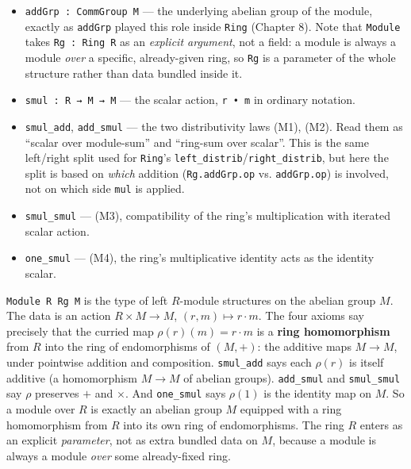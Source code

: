 \begin{itemize}
\tightlist
\item
  \texttt{addGrp : CommGroup M} --- the underlying abelian group of the module, exactly as \texttt{addGrp} played this role inside \texttt{Ring} (Chapter 8). Note that \texttt{Module} takes \texttt{Rg : Ring R} as an \emph{explicit argument}, not a field: a module is always a module \emph{over} a specific, already-given ring, so \texttt{Rg} is a parameter of the whole structure rather than data bundled inside it.
\item
  \texttt{smul : R → M → M} --- the scalar action, \texttt{r • m} in ordinary notation.
\item
  \texttt{smul\_\allowbreak{}add}, \texttt{add\_\allowbreak{}smul} --- the two distributivity laws (M1), (M2). Read them as ``scalar over module-sum'' and ``ring-sum over scalar''. This is the same left/right split used for \texttt{Ring}'s \texttt{left\_\allowbreak{}distrib}/\texttt{right\_\allowbreak{}distrib}, but here the split is based on \emph{which} addition (\texttt{Rg.addGrp.op} vs. \texttt{addGrp.op}) is involved, not on which side \texttt{mul} is applied.
\item
  \texttt{smul\_\allowbreak{}smul} --- (M3), compatibility of the ring's multiplication with iterated scalar action.
\item
  \texttt{one\_\allowbreak{}smul} --- (M4), the ring's multiplicative identity acts as the identity scalar.
\end{itemize}

\begin{mathreading}

\texttt{Module R Rg M} is the type of left \(R\)-module structures on the abelian group \(M\). The data is an action \(R \times M \to
M\), \((r,m)\mapsto r\cdot m\). The four axioms say precisely that the curried map \(\rho(r)(m) = r\cdot m\) is a \textbf{ring homomorphism} from \(R\) into the ring of endomorphisms of \((M,+)\): the additive maps \(M \to M\), under pointwise addition and composition. \texttt{smul\_\allowbreak{}add} says each \(\rho(r)\) is itself additive (a homomorphism \(M \to M\) of abelian groups). \texttt{add\_\allowbreak{}smul} and \texttt{smul\_\allowbreak{}smul} say \(\rho\) preserves \(+\) and \(\times\). And \texttt{one\_\allowbreak{}smul} says \(\rho(1)\) is the identity map on \(M\). So a module over \(R\) is exactly an abelian group \(M\) equipped with a ring homomorphism from \(R\) into its own ring of endomorphisms. The ring \(R\) enters as an explicit \emph{parameter}, not as extra bundled data on \(M\), because a module is always a module \emph{over} some already-fixed ring.

\end{mathreading}

